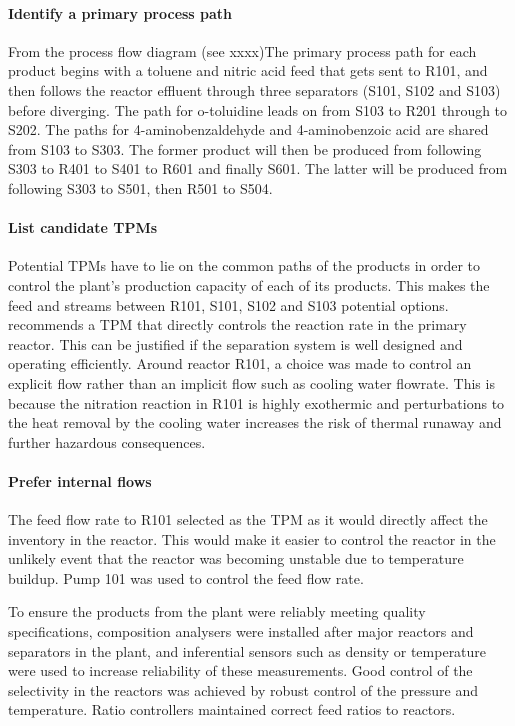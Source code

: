 \paragraph{Identify a primary process path}
From the process flow diagram (see xxxx)The primary process path for each product begins with a toluene and nitric acid feed that gets sent to R101, and then follows the reactor effluent through three separators (S101, S102 and S103) before diverging. The path for o-toluidine leads on from S103 to R201 through to S202. The paths for 4-aminobenzaldehyde and 4-aminobenzoic acid are shared from S103 to S303. The former product will then be produced from following S303 to R401 to S401 to R601 and finally S601. The latter will be produced from following S303 to S501, then R501 to S504.  

\paragraph{List candidate TPMs}
Potential TPMs have to lie on the common paths of the products in order to control the plant's production capacity of each of its products. This makes the feed and streams between R101, S101, S102 and S103 potential options. \textcite{} recommends a TPM that directly controls the reaction rate in the primary reactor. This can be justified if the separation system is well designed and operating efficiently. Around reactor R101, a choice was made to control an explicit flow rather than an implicit flow such as cooling water flowrate. This is because the nitration reaction in R101 is highly exothermic and perturbations to the heat removal by the cooling water increases the risk of thermal runaway and further hazardous consequences. 

\paragraph{Prefer internal flows}
The feed flow rate to R101 selected as the TPM as it would directly affect the inventory in the reactor. This would make it easier to control the reactor in the unlikely event that the reactor was becoming unstable due to temperature buildup. Pump 101 was used to control the feed flow rate.

To ensure the products from the plant were reliably meeting quality specifications, composition analysers were installed after major reactors and separators in the plant, and inferential sensors such as density or temperature were used to increase reliability of these measurements. Good control of the selectivity in the reactors was achieved by robust control of the pressure and temperature. Ratio controllers maintained correct feed ratios to reactors.

